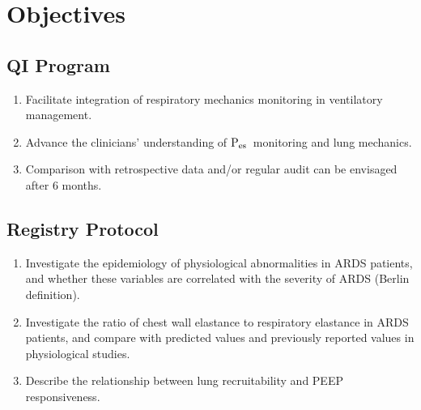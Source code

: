 \documentclass[11pt]{article} %
\def\Paw{$\rm{P_{aw}}$}
\def\Pes{$\rm{P_{es}}$}
\begin{document}
\section{Objectives}
 \subsection{QI Program}
\begin{enumerate}[label=(\alph*)]
\item Facilitate integration of respiratory mechanics monitoring in ventilatory management.
\item Advance the clinicians' understanding of \Pes~monitoring and lung mechanics.
\item Comparison with retrospective data and/or regular audit can be envisaged after 6 months.
\end{enumerate}

 \subsection{Registry Protocol}
\begin{enumerate}[label=(\alph*)]
 \item Investigate the epidemiology of physiological abnormalities in ARDS patients, and whether these variables are correlated with the severity of ARDS (Berlin definition).
 \item Investigate the ratio of chest wall elastance to respiratory elastance in ARDS patients, and compare with predicted values and previously reported values in physiological studies.
\item Describe the relationship between lung recruitability and PEEP responsiveness.
 
 
\end{enumerate}
 
\end{document}
